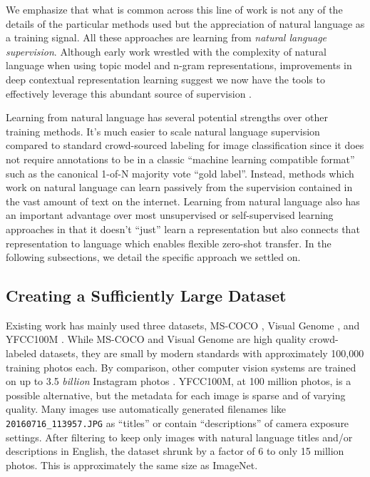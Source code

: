 We emphasize that what is common across this line of work is not any of the details of the particular methods used but the appreciation of natural language as a training signal. All these approaches are learning from \textit{natural language supervision}. Although early work wrestled with the complexity of natural language when using topic model and n-gram representations, improvements in deep contextual representation learning suggest we now have the tools to effectively leverage this abundant source of supervision \citep{mccann2017learned}.

Learning from natural language has several potential strengths over other training methods. It's much easier to scale natural language supervision compared to standard crowd-sourced labeling for image classification since it does not require annotations to be in a classic ``machine learning compatible format'' such as the canonical 1-of-N majority vote ``gold label''. Instead, methods which work on natural language can learn passively from the supervision contained in the vast amount of text on the internet. Learning from natural language also has an important advantage over most unsupervised or self-supervised learning approaches in that it doesn't ``just'' learn a representation but also connects that representation to language which enables flexible zero-shot transfer. In the following subsections, we detail the specific approach we settled on.

\subsection{Creating a Sufficiently Large Dataset}\label{subsection:creating-large-dataset}

Existing work has mainly used three datasets, MS-COCO \citep{lin2014microsoft}, Visual Genome \citep{krishna2017visual}, and YFCC100M \citep{thomee2016yfcc100m}. While MS-COCO and Visual Genome are high quality crowd-labeled datasets, they are small by modern standards with approximately 100,000 training photos each. By comparison, other computer vision systems are trained on up to 3.5 \textit{billion} Instagram photos \citep{mahajan2018exploring}. YFCC100M, at 100 million photos, is a possible alternative, but the metadata for each image is sparse and of varying quality. Many images use automatically generated filenames like \texttt{20160716\_113957.JPG} as ``titles'' or contain ``descriptions'' of camera exposure settings. After filtering to keep only images with natural language titles and/or descriptions in English, the dataset shrunk by a factor of 6 to only 15 million photos. This is approximately the same size as ImageNet.

